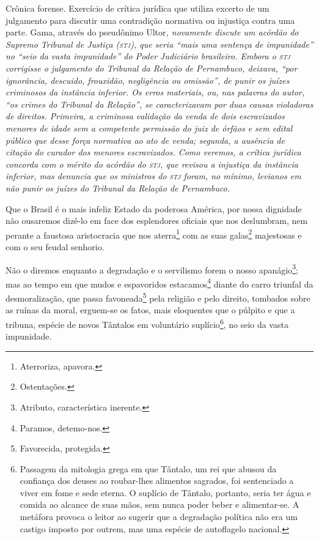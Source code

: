 \begin{didascalia}
Crônica forense. Exercício de crítica jurídica que utiliza excerto de um
julgamento para discutir uma contradição normativa ou injustiça contra
uma parte. Gama, através do pseudônimo Ultor\emph{, novamente discute
um acórdão do Supremo Tribunal de Justiça (\textsc{stj}), que seria ``mais uma
sentença de impunidade'' no ``seio da vasta impunidade'' do Poder
Judiciário brasileiro. Embora o \textsc{stj} corrigisse o julgamento do Tribunal
da Relação de Pernambuco, deixava, ``por ignorância, descuido, frouxidão,
negligência ou omissão'', de punir os juízes criminosos da instância
inferior. Os erros materiais, ou, nas palavras do autor, ``os crimes do
Tribunal da Relação'', se caracterizavam por duas causas violadoras de
direitos. Primeira, a criminosa validação da venda de dois escravizados
menores de idade sem a competente permissão do juiz de órfãos e sem
edital público que desse força normativa ao ato de venda; segunda, a
ausência de citação do curador dos menores escravizados. Como veremos, a
crítica jurídica concorda com o mérito do acórdão do \textsc{stj}, que revisou a
injustiça da instância inferior, mas denuncia que os ministros do \textsc{stj}
foram, no mínimo, levianos em não punir os juízes do Tribunal da Relação
de Pernambuco.}
\end{didascalia}



Que o Brasil é o mais infeliz Estado da poderosa América, por nossa
dignidade não ousaremos dizê-lo em face dos esplendores oficiais que nos
deslumbram, nem perante a faustosa aristocracia que nos
aterra\footnote{Aterroriza, apavora.} com as suas galas\footnote{
  Ostentações.} majestosas e com o seu feudal senhorio.

Não o diremos enquanto a degradação e o servilismo forem o nosso
apanágio\footnote{Atributo, característica inerente.}; mas ao tempo em
que mudos e espavoridos estacamos\footnote{Paramos, detemo-nos.}
diante do carro triunfal da desmoralização, que passa
favoneada\footnote{Favorecida, protegida.} pela religião e pelo
direito, tombados sobre as ruínas da moral, erguem-se os fatos, mais
eloquentes que o púlpito e que a tribuna, espécie de novos Tântalos em
voluntário suplício\footnote{Passagem da mitologia grega em que
  Tântalo, um rei que abusou da confiança dos deuses ao roubar-lhes
  alimentos sagrados, foi sentenciado a viver em fome e sede eterna. O
  suplício de Tântalo, portanto, seria ter água e comida ao alcance de
  suas mãos, sem nunca poder beber e alimentar-se. A metáfora provoca o
  leitor ao sugerir que a degradação política não era um castigo imposto
  por outrem, mas uma espécie de autoflagelo nacional.}, no seio da
vasta impunidade.

